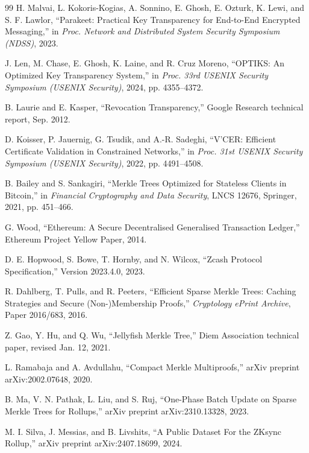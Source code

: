 \begin{thebibliography}{99}
H. Malvai, L. Kokoris-Kogias, A. Sonnino, E. Ghosh, E. Ozturk, K. Lewi, and S. F. Lawlor,
\newblock ``Parakeet: Practical Key Transparency for End-to-End Encrypted Messaging,''
\newblock in \emph{Proc. Network and Distributed System Security Symposium (NDSS)}, 2023.

J. Len, M. Chase, E. Ghosh, K. Laine, and R. Cruz Moreno,
\newblock ``OPTIKS: An Optimized Key Transparency System,''
\newblock in \emph{Proc. 33rd USENIX Security Symposium (USENIX Security)}, 2024, pp. 4355--4372.

B. Laurie and E. Kasper,
\newblock ``Revocation Transparency,''
\newblock Google Research technical report, Sep. 2012.

D. Koisser, P. Jauernig, G. Tsudik, and A.-R. Sadeghi,
\newblock ``V'CER: Efficient Certificate Validation in Constrained Networks,''
\newblock in \emph{Proc. 31st USENIX Security Symposium (USENIX Security)}, 2022, pp. 4491--4508.

B. Bailey and S. Sankagiri,
\newblock ``Merkle Trees Optimized for Stateless Clients in Bitcoin,''
\newblock in \emph{Financial Cryptography and Data Security}, LNCS 12676, Springer, 2021, pp. 451--466.

G. Wood,
\newblock ``Ethereum: A Secure Decentralised Generalised Transaction Ledger,''
\newblock Ethereum Project Yellow Paper, 2014.

D. E. Hopwood, S. Bowe, T. Hornby, and N. Wilcox,
\newblock ``Zcash Protocol Specification,''
\newblock Version 2023.4.0, 2023.

R. Dahlberg, T. Pulls, and R. Peeters,
\newblock ``Efficient Sparse Merkle Trees: Caching Strategies and Secure (Non-)Membership Proofs,''
\newblock \emph{Cryptology ePrint Archive}, Paper 2016/683, 2016.

Z. Gao, Y. Hu, and Q. Wu,
\newblock ``Jellyfish Merkle Tree,''
\newblock Diem Association technical paper, revised Jan. 12, 2021.

L. Ramabaja and A. Avdullahu,
\newblock ``Compact Merkle Multiproofs,''
\newblock arXiv preprint arXiv:2002.07648, 2020.

B. Ma, V. N. Pathak, L. Liu, and S. Ruj,
\newblock ``One-Phase Batch Update on Sparse Merkle Trees for Rollups,''
\newblock arXiv preprint arXiv:2310.13328, 2023.

M. I. Silva, J. Messias, and B. Livshits,
\newblock ``A Public Dataset For the ZKsync Rollup,''
\newblock arXiv preprint arXiv:2407.18699, 2024.


\end{thebibliography}
